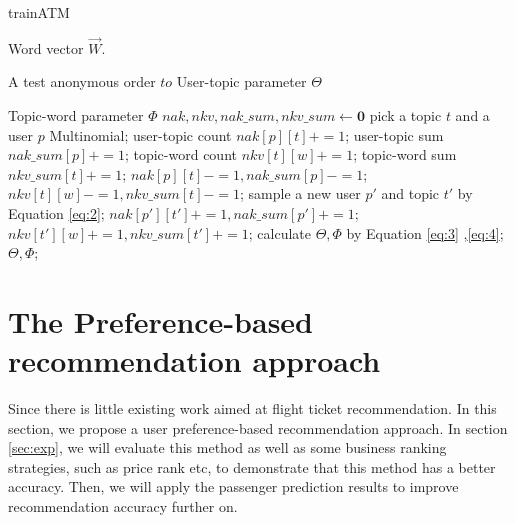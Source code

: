 \documentclass{llncs}
\begin{document}
\begin{algorithm}[htb]
\caption{trainATM}
\begin{algorithmic}[1]
\label{alg:2}
\REQUIRE
Word vector $\overrightarrow{W}$. \par
A test anonymous order $to$
\ENSURE 
User-topic parameter $\Theta$ \par
Topic-word parameter $\Phi$
\STATE $nak , nkv, nak\_sum, nkv\_sum \leftarrow \mathbf{0}$
\STATE pick a topic $t$ and a user $p$ Multinomial;
\STATE user-topic count $nak[p][t] += 1$;
\STATE user-topic sum $nak\_sum[p] += 1$;
\STATE topic-word count $nkv[t][w] += 1$;
\STATE topic-word sum $nkv\_sum[t] += 1$;
\ENDFOR
\ENDFOR
{}
\STATE $nak[p][t] -= 1, nak\_sum[p] -= 1$;
\STATE $nkv[t][w] -= 1, nkv\_sum[t] -= 1$;
\STATE sample a new user $p'$ and topic $t'$ by Equation \ref{eq:2};
\STATE $nak[p'][t'] += 1, nak\_sum[p'] += 1$;
\STATE $nkv[t'][w] += 1, nkv\_sum[t'] += 1$;
\ENDFOR
\ENDFOR
\ENDWHILE
\STATE calculate $\Theta,\Phi$ by Equation \ref{eq:3} ,\ref{eq:4};
\RETURN $\Theta,\Phi$;
\end{algorithmic} 
\end{algorithm}

\section{The Preference-based recommendation approach}
\label{sec:rec}
Since there is little existing work aimed at flight ticket recommendation. In this section, we propose a user preference-based recommendation approach. In section \ref{sec:exp}, we will evaluate this method as well as some business ranking strategies, such as price rank etc, to demonstrate that this method has a better accuracy. Then, we will apply the passenger prediction results to improve recommendation accuracy further on.
\end{document}
